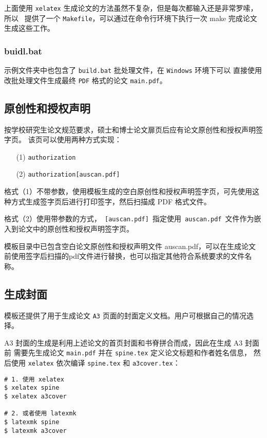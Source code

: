 上面使用 \texttt{xelatex} 生成论文的方法虽然不复杂，但是每次都输入还是非常罗嗦，所以 \heuthesis\
提供了一个 \texttt{Makefile}，可以通过在命令行环境下执行一次 make 完成论文生成这些工作。

\subsubsection{buidl.bat}
\label{sec:build}

示例文件夹中也包含了 \texttt{build.bat} 批处理文件，在 \texttt{Windows} 环境下可以
直接使用改批处理文件生成最终 \texttt{PDF} 格式的论文 \texttt{main.pdf}。

\subsection{原创性和授权声明}
\label{sec:generate-auth}

按学校研究生论文规范要求，硕士和博士论文扉页后应有论文原创性和授权声明签字页。
该页可以使用两种方式实现：

\begin{enumerate}
  \item[(1)] \texttt{\cs authorization}
  \item[(2)] \texttt{\cs authorization[auscan.pdf]}
\end{enumerate}

格式（1）不带参数，使用模板生成的空白原创性和授权声明签字页，可先使用这种方式生成签字页后进行打印签字，然后扫描成 PDF 格式文件。

格式（2）使用带参数的方式，~\texttt{[auscan.pdf]}~指定使用~\texttt{auscan.pdf}~文件作为嵌入到论文中的原创性和授权声明签字页。

模板目录中已包含空白论文原创性和授权声明文件 auscan.pdf，可以在生成论文前使用签字后扫描的pdf文件进行替换，也可以指定其他符合系统要求的文件名称。

\subsection{生成封面}
\label{sec:generate-cover}

模板还提供了用于生成论文 \texttt{A3} 页面的封面定义文档。用户可根据自己的情况选择。

A3 封面的生成是利用上述论文的首页封面和书脊拼合而成，因此在生成 A3 封面前
需要先生成论文 \texttt{main.pdf} 并在 \texttt{spine.tex} 定义论文标题和作者姓名信息，
然后使用 \texttt{xelatex} 依次编译 \texttt{spine.tex} 和 \texttt{a3cover.tex}：

\begin{lstlisting}
# 1. 使用 xelatex
$ xelatex spine
$ xelatex a3cover

# 2. 或者使用 latexmk
$ latexmk spine
$ latexmk a3cover
\end{lstlisting}

